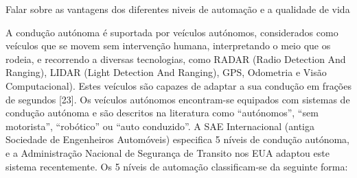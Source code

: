 \documentclass[a4paper,10pt]{texRel}
\begin{document}
Falar sobre as vantagens dos diferentes niveis de automação e a qualidade de vida

A condução autónoma é suportada por veículos autónomos, considerados como veículos que se movem sem intervenção humana, interpretando o meio que os rodeia, e recorrendo a diversas tecnologias, como RADAR (Radio Detection And Ranging), LIDAR (Light Detection And Ranging), GPS, Odometria e Visão Computacional). Estes veículos são capazes de adaptar a sua condução em frações de segundos [23]. Os veículos autónomos encontram-se equipados com sistemas de condução autónoma e são descritos na literatura como “autónomos”, “sem motorista”, “robótico” ou “auto conduzido”. A SAE Internacional (antiga Sociedade de Engenheiros Automóveis) especifica 5 níveis de condução autónoma, e a Administração Nacional de Segurança de Transito nos EUA adaptou este sistema recentemente. Os 5 níveis de automação classificam-se da seguinte forma:
\end{document}
